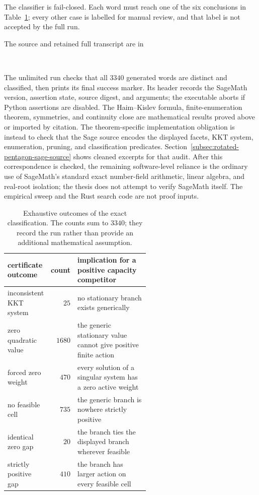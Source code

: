 The classifier is fail-closed.  Each word must reach one of the six conclusions
in Table~\ref{tab:rotated-pentagon-certificate-outcomes}; every other case is
labelled for manual review, and that label is not accepted by the full run.

The source and retained full transcript are in
\begin{center}
  \small{}\\[-0.2em]
\end{center}
The unlimited run checks that all \(3340\) generated words are distinct and
classified, then prints its final success marker.  Its header
records the SageMath version, assertion state, source digest, and arguments;
the executable aborts if Python assertions are disabled.  The Haim--Kislev
formula, finite-enumeration theorem, symmetries, and continuity close are
mathematical results proved above or imported by citation.  The
theorem-specific implementation obligation is instead to check that the Sage
source encodes the displayed facets, KKT system, enumeration, pruning, and
classification predicates.  Section~\ref{subsec:rotated-pentagon-sage-source}
shows cleaned excerpts for that audit.  After this correspondence is checked,
the remaining software-level reliance is the ordinary use of SageMath's
standard exact number-field arithmetic, linear algebra, and real-root
isolation; the thesis does not attempt to verify SageMath itself.  The
empirical sweep and the Rust search code are not proof inputs.

\begin{table}[htbp]
\centering
\small
\begin{tabular}{@{}lrp{0.56\linewidth}@{}}
\toprule
certificate outcome & count & implication for a positive capacity competitor\\
\midrule
inconsistent KKT system & \(25\) & no stationary branch exists generically\\
zero quadratic value & \(1680\) & the generic stationary value cannot give positive finite action\\
forced zero weight & \(470\) & every solution of a singular system has a zero active weight\\
no feasible cell & \(735\) & the generic branch is nowhere strictly positive\\
identical zero gap & \(20\) & the branch ties the displayed branch wherever feasible\\
strictly positive gap & \(410\) & the branch has larger action on every feasible cell\\
\bottomrule
\end{tabular}
\caption{Exhaustive outcomes of the exact classification.  The counts sum to
\(3340\); they record the run rather than provide an additional mathematical
assumption.}
\label{tab:rotated-pentagon-certificate-outcomes}
\end{table}
\FloatBarrier

